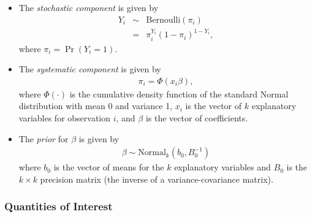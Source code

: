 \begin{itemize}
\item The \emph{stochastic component} is given by
\begin{eqnarray*}
Y_{i}  &  \sim & \textrm{Bernoulli}(\pi_{i})\\
&  = & \pi_{i}^{Y_{i}}(1-\pi_{i})^{1-Y_{i}},
\end{eqnarray*}
where $\pi_{i}=\Pr(Y_{i}=1)$.

\item The \emph{systematic component} is given by
\begin{eqnarray*}
\pi_{i}= \Phi(x_i \beta),
\end{eqnarray*}
where $\Phi(\cdot)$ is the cumulative density function of the standard
Normal distribution with mean 0 and variance 1, $x_{i}$ is the vector
of $k$ explanatory variables for observation $i$, and $\beta$ is the
vector of coefficients.

\item The \emph{prior} for $\beta$ is given by
\begin{eqnarray*}
\beta \sim \textrm{Normal}_k \left(  b_{0}, B_{0}^{-1} \right)
\end{eqnarray*}
where $b_{0}$ is the vector of means for the $k$ explanatory variables
and $B_{0}$ is the $k \times k$ precision matrix (the inverse of a
variance-covariance matrix).
\end{itemize}

\subsubsection{Quantities of Interest}

